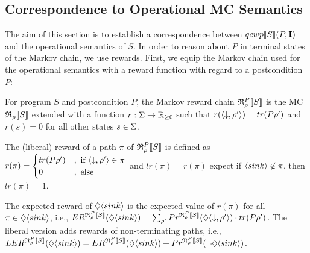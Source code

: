 \documentclass[a4paper,UKenglish,cleveref, autoref, thm-restate]{lipics-v2021}
\begin{document}
\subsection{Correspondence to Operational MC Semantics}
The aim of this section is to establish a correspondence between $qcwp\llbracket S \rrbracket (P,\textbf{I})$ and the operational semantics of $S$. In order to reason about $P$ in terminal states of the Markov chain, we use rewards. First, we equip the Markov chain used for the operational semantics with a reward function with regard to a postcondition $P$:
\begin{definition}
    \label{def:opMC}
    For program $S$ and postcondition $P$, the Markov reward chain $\mathfrak{R}_{\rho}^{P}\llbracket S \rrbracket$ is the MC $\mathfrak{R}_{\rho}\llbracket S \rrbracket$ extended with a function $r:\Sigma \to \mathbb{R}_{\geq 0}$ such that $r(\langle \downarrow , \rho' \rangle) = tr(P\rho')$ and $r(s)=0$ for all other states $s \in \Sigma$.
\end{definition}
The (liberal) reward of a path $\pi$ of $\mathfrak{R}_{\rho}^{P}\llbracket S \rrbracket$ is defined as
 $r(\pi) = \begin{cases}
    tr(P\rho') &,\text{ if } \langle \downarrow , \rho' \rangle\in \pi\\
    0 &, \text{ else}
\end{cases}$ and $lr(\pi)=r(\pi)$ expect if $\langle sink \rangle \not \in \pi$, then $lr(\pi)=1$.


The expected reward of $\lozenge \langle sink \rangle$ is the expected value of $r(\pi)$ for all $\pi\in \lozenge \langle sink \rangle$, i.e., $ER^{\mathfrak{R}_{\rho}^{P}\llbracket S \rrbracket} (\lozenge \langle sink \rangle) = \sum_{\rho'} Pr^{\mathfrak{R}_{\rho}^{P}\llbracket S \rrbracket}(\lozenge \langle \downarrow , \rho' \rangle)\cdot tr(P\rho')$. The liberal version adds rewards of non-terminating paths, i.e., $LER^{\mathfrak{R}_{\rho}^{P}\llbracket S \rrbracket} (\lozenge \langle sink \rangle) = ER^{\mathfrak{R}_{\rho}^{P}\llbracket S \rrbracket} (\lozenge \langle sink \rangle) + Pr^{\mathfrak{R}_{\rho}^{P}\llbracket S \rrbracket}(\neg \lozenge \langle sink \rangle)$.
\end{document}
